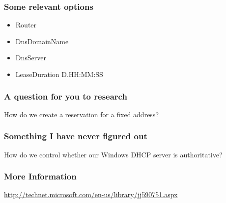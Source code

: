 \documentclass[10pt]{beamer}
\begin{document}
\begin{frame}[fragile]
  \frametitle{Some relevant options}

  \begin{itemize}
   \item Router
   \item DnsDomainName
   \item DnsServer
   \item LeaseDuration D.HH:MM:SS
  \end{itemize}  
\end{frame}

\begin{frame}[fragile]
  \frametitle{A question for you to research}

  How do we create a reservation for a fixed address?
\end{frame}
\begin{frame}[fragile]
  \frametitle{Something I have never figured out}

  How do we control whether our Windows DHCP server is authoritative?
\end{frame}
\begin{frame}[fragile]
  \frametitle{More Information}
   \url{http://technet.microsoft.com/en-us/library/jj590751.aspx}
\end{frame}
\end{document}
